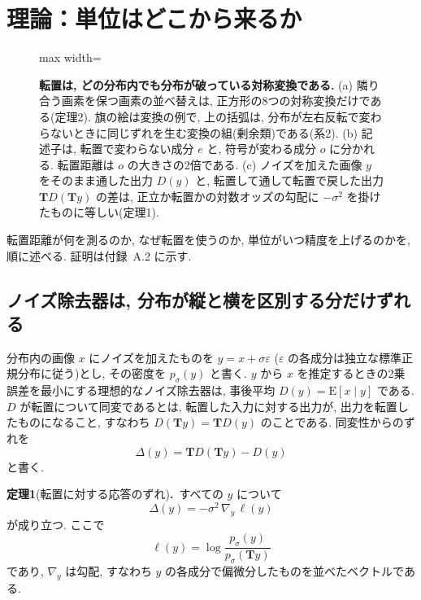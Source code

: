 \documentclass[MIRU,submit]{miru2025j}
\makeatletter
\newcommand{\Tm}{\mathbf{T}}            %
\newcommand{\thm}[2]{\par\vspace{0.6mm}\noindent\textbf{#1}#2\textbf{.}\ }             %
\renewenvironment{figure*}{\@floatenv\capwidth\textwidth\ecapwidth\textwidth\abovecaptionskip1mm\belowcaptionskip\z@\@dblfloat{figure}}{\end@dblfloat}
\makeatother
\begin{document}
\section{理論：単位はどこから来るか}
\label{sec:theory}
\begin{figure}[t]\centering
\begin{adjustbox}{max width=\textwidth}\end{adjustbox}
\caption{\textbf{転置は, どの分布内でも分布が破っている対称変換である.} (a) 隣り合う画素を保つ画素の並べ替えは, 正方形の8つの対称変換だけである(定理2). 旗の絵は変換の例で, 上の括弧は, 分布が左右反転で変わらないときに同じずれを生む変換の組(剰余類)である(系2). (b) 記述子は, 転置で変わらない成分 $e$ と, 符号が変わる成分 $o$ に分かれる. 転置距離は $o$ の大きさの2倍である. (c) ノイズを加えた画像 $y$ をそのまま通した出力 $D(y)$ と, 転置して通して転置で戻した出力 $\Tm D(\Tm y)$ の差は, 正立か転置かの対数オッズの勾配に $-\sigma^{2}$ を掛けたものに等しい(定理1).}
\label{fig:sym}
\end{figure}
転置距離が何を測るのか, なぜ転置を使うのか, 単位がいつ精度を上げるのかを, 順に述べる. 証明は付録~A.2 に示す.

\subsection{ノイズ除去器は, 分布が縦と横を区別する分だけずれる}
\label{sec:defect}
分布内の画像 $x$ にノイズを加えたものを $y=x+\sigma\varepsilon$ ($\varepsilon$ の各成分は独立な標準正規分布に従う)とし, その密度を $p_\sigma(y)$ と書く. $y$ から $x$ を推定するときの2乗誤差を最小にする理想的なノイズ除去器は, 事後平均 $D(y)=\mathrm{E}[x\mid y]$ である. $D$ が転置について同変であるとは, 転置した入力に対する出力が, 出力を転置したものになること, すなわち $D(\Tm y)=\Tm D(y)$ のことである. 同変性からのずれを
\begin{equation}
\Delta(y)=\Tm D(\Tm y)-D(y)
\label{eq:defect}
\end{equation}
と書く.

\thm{定理1}{(転置に対する応答のずれ)}すべての $y$ について
\begin{equation}
\Delta(y)=-\sigma^{2}\,\nabla_{y}\,\ell(y)
\label{eq:thm1}
\end{equation}
が成り立つ. ここで
\begin{equation}
\ell(y)=\log\frac{p_\sigma(y)}{p_\sigma(\Tm y)}
\label{eq:ell}
\end{equation}
であり, $\nabla_y$ は勾配, すなわち $y$ の各成分で偏微分したものを並べたベクトルである.\par\vspace{0.6mm}
\end{document}
